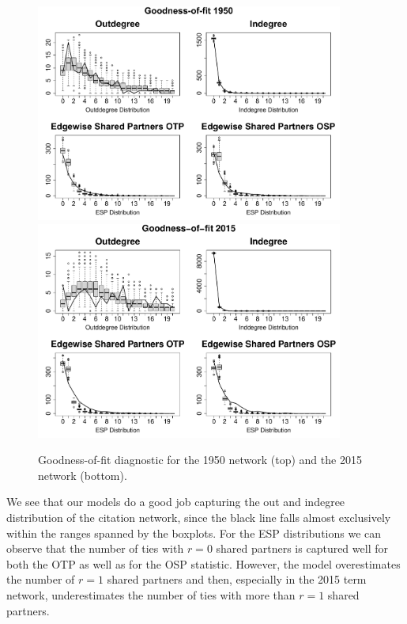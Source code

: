 \documentclass{cup-pan}
\begin{document}
\begin{figure}[bt]
 \begin{center}
\includegraphics[width=0.9\textwidth]{GOF_1950}\\
\vspace{1cm}
\includegraphics[width=0.9\textwidth]{GOF_2015}
\vspace{0.1cm}
\caption{Goodness-of-fit diagnostic for the 1950 network (top) and the 2015 network (bottom).}
 \label{GOF}
\vspace{-.25cm}
\end{center}
\end{figure} 


We see that our models do a good job capturing the out and indegree distribution of the citation network, since the black line falls almost exclusively within the ranges spanned by the boxplots. For the ESP distributions we can observe that the number of ties with $r=0$ shared partners is captured well for both the OTP as well as for the OSP statistic. However, the model overestimates the number of $r=1$ shared partners and then, especially in the 2015 term network, underestimates the number of ties with more than $r=1$ shared partners. 
\end{document}
